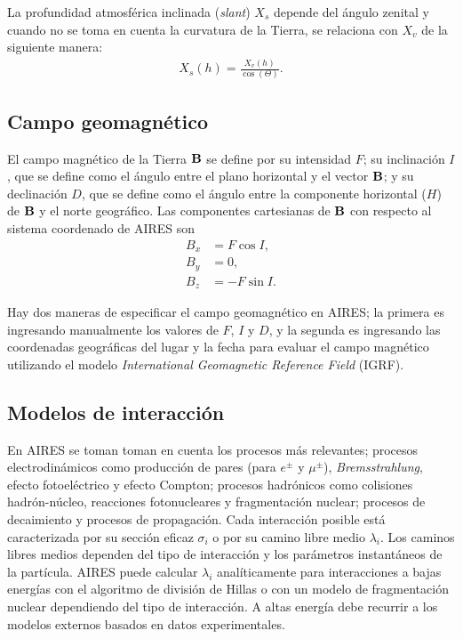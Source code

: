 	La profundidad atmosférica inclinada (\textit{slant}) $X_s$ depende del ángulo zenital y cuando no se toma en cuenta la curvatura de la Tierra, se relaciona con $X_v$ de la siguiente manera:
	\begin{align}
	X_s (h) = \frac{X_v (h)}{\cos(\Theta)}.
	\end{align}
	
	\subsection{Campo geomagnético}
	El campo magnético de la Tierra $\vb{B}$ se define por su intensidad $F$; su inclinación $I$, que se define como el ángulo entre el plano horizontal y el vector $\vb{B}$; y su declinación $D$, que se define como el ángulo entre la componente horizontal ($H$) de $\vb{B}$ y el norte geográfico. Las componentes cartesianas de $\vb{B}$ con respecto al sistema coordenado de AIRES son 
	\begin{align}
	B_x &= F \cos I, \\
	B_y &= 0, \\
	B_z &= -F \sin I.
	\end{align}	 
	
	Hay dos maneras de especificar el campo geomagnético en AIRES; la primera es ingresando manualmente los valores de $F$, $I$ y $D$, y la segunda es ingresando las coordenadas geográficas del lugar y la fecha para evaluar el campo magnético utilizando el modelo \textit{International Geomagnetic Reference Field} (IGRF).  	
	
	\subsection{Modelos de interacción}
	En AIRES se toman toman en cuenta los procesos más relevantes; procesos electrodinámicos como producción de pares (para $e^{\pm}$ y $\mu^{\pm}$), \textit{Bremsstrahlung}, efecto fotoeléctrico y efecto Compton; procesos hadrónicos como colisiones hadrón-núcleo, reacciones fotonucleares y fragmentación nuclear; procesos de decaimiento y procesos de propagación. Cada interacción posible está caracterizada por su sección eficaz $\sigma_i$ o por su camino libre medio $\lambda_i$. Los caminos libres medios dependen del tipo de interacción y los parámetros instantáneos de la partícula. AIRES puede calcular $\lambda_i$ analíticamente para interacciones a bajas energ\'ias con el algoritmo de divisi\'on de Hillas o con un modelo de fragmentaci\'on nuclear dependiendo del tipo de interacci\'on. A altas energ\'ia debe recurrir a los modelos externos basados en datos experimentales. 
	
